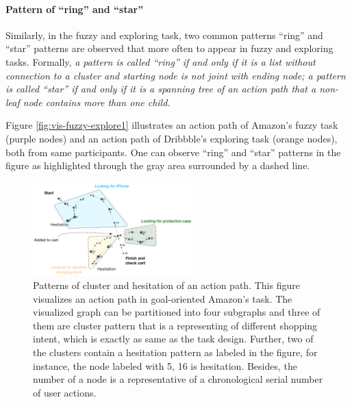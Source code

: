 \paragraph{Pattern of ``ring'' and ``star''}
Similarly, in the fuzzy and exploring task, two common patterns ``ring'' and ``star''
patterns are observed that more often to appear in fuzzy and exploring tasks.
Formally, \emph{a pattern is called ``ring'' if and only if it is a list without connection to a cluster
and starting node is not joint with ending node; a pattern is called ``star'' if and only if 
it is a spanning tree of an action path that a non-leaf node contains more than one child.}


Figure \ref{fig:vis-fuzzy-explore1} illustrates an action path of Amazon's fuzzy task (purple nodes)
and an action path of Dribbble's exploring task (orange nodes), both from same participants.
One can observe ``ring'' and ``star'' patterns in the figure as highlighted through 
the gray area surrounded by a dashed line.


\begin{figure}[H]
    \centering
    \includegraphics[width=0.55\textwidth]{figures/vis-goal2}
    \caption{Patterns of cluster and hesitation of an action path. This figure visualizes an action path in
    goal-oriented Amazon's task. The visualized graph can be partitioned into four subgraphs and three of them are cluster pattern that is a representing of different shopping intent, 
    which is exactly as same as the task design. Further, two of the clusters contain a hesitation pattern as labeled in the figure, for instance, the node labeled with 5, 16 is hesitation. 
    Besides, the number of a node
    is a representative of a chronological serial number of user actions.}
    \label{fig:vis-goal2}
\end{figure}

